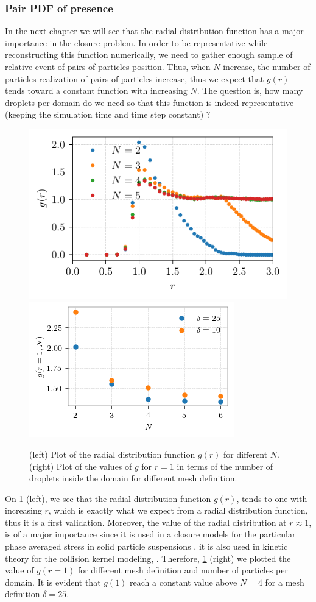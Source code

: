 \subsubsection{Pair PDF of presence}

In the next chapter we will see that the radial distribution function has a major importance in the closure problem. 
In order to be representative while reconstructing this function numerically, we need to gather enough sample of relative event of pairs of particles position. 
Thus, when $N$ increase, the number of particles realization of pairs of particles increase, thus we expect that $g(r)$ tends toward a constant function with increasing $N$. 
The question is, how many droplets per domain do we need so that this function is indeed representative (keeping the simulation time and time step constant) ? 
\begin{figure}[h!]
    \centering
    \includegraphics[height= 0.3\textwidth]{image/VALIDATION/fDist/g_r.pdf}
    \includegraphics[height= 0.3\textwidth]{image/VALIDATION/fDist/N_g_1.pdf}
    \caption{(left) Plot of the radial distribution function $g(r)$ for different $N$. 
             (right) Plot of the values of $g$ for $r =1$ in terms of the number of droplets inside the domain for different mesh definition. }
    \label{fig:g_r}
\end{figure}
On \ref{fig:g_r} (left), we see that the radial distribution function $g(r)$, tends to one with increasing $r$, which is exactly what we expect from a radial distribution function, thus it is a first validation. 
Moreover, the value of the radial distribution at $r\approx1$, is of a major importance since it is used in a closure models for the particular phase averaged stress in solid particle suspensions \citep{jackson2000dynamics}, it is also used in kinetic theory for the collision kernel modeling, \citep{fede2015monte}.
Therefore, \ref{fig:g_r} (right) we plotted the value of $g(r=1)$ for different mesh definition and number of particles per domain. 
It is evident that $g(1)$ reach a constant value above $N=4$ for a mesh definition $\delta = 25$. 

